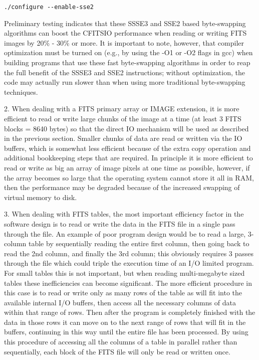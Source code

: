 \documentclass[11pt]{book}
\begin{document}
\begin{verbatim}
./configure --enable-sse2
\end{verbatim}
Preliminary testing indicates that these SSSE3 and SSE2 based
byte-swapping algorithms can boost the CFITSIO performance when
reading or writing FITS images by 20\% - 30\% or more.
It is important to note, however, that compiler optimization must be
turned on (e.g., by using the -O1 or -O2 flags in gcc) when building
programs that use these fast byte-swapping algorithms in order
to reap the full benefit of the SSSE3 and SSE2 instructions; without
optimization, the code may actually run slower than when using
more traditional byte-swapping techniques.

2.  When dealing with a FITS primary array or IMAGE extension, it is
more efficient to read or write large chunks of the  image at a time
(at least 3 FITS blocks = 8640 bytes) so that the direct IO mechanism
will be used as described in the previous section.  Smaller chunks of
data are read or written via the IO buffers, which is somewhat less
efficient because of the extra copy operation and additional
bookkeeping steps that are required.  In principle it is more efficient
to read or write as big an array of image pixels at one time as
possible, however, if the array becomes so large that the operating
system cannot store it all in RAM, then the performance may be degraded
because of the increased swapping of virtual memory to disk.

3.  When dealing with FITS tables, the most important efficiency factor
in the software design is to read or write the data in the FITS file in
a single pass through the file.  An example of poor program design
would be to read a large, 3-column table by sequentially reading the
entire first column, then going back to read the 2nd column, and
finally the 3rd column; this obviously requires 3 passes through the
file which could triple the execution time of an I/O limited program.
For small tables this is not important, but when reading multi-megabyte
sized tables these inefficiencies can become significant.  The more
efficient procedure in this case is to read or write only as many rows
of the table as will fit into the available internal I/O buffers, then
access all the necessary columns of data within that range of rows.
Then after the program is completely finished with the data in those
rows it can move on to the next range of rows that will fit in the
buffers, continuing in this way until the entire file has been
processed.  By using this procedure of accessing all the columns of a
table in parallel rather than sequentially, each block of the FITS file
will only be read or written once.
\end{document}
